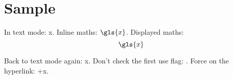 \documentclass{report}
\begin{document}
\chapter{Sample}
In text mode: \gls{x}. Inline maths: $\gls{x}$. Displayed
maths:
\[
  \gls{x}
\]

Back to text mode again: \gls{x}. Don't check the first use flag:
. Force on the hyperlink: \glstext+{x}.

\printglossaries
\end{document}
